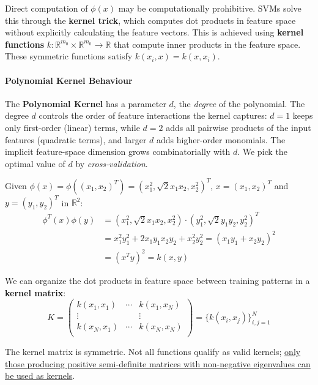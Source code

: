 Direct computation of $\phi(x)$ may be computationally prohibitive. SVMs solve this through the \textbf{kernel trick}, which computes dot products in feature space without explicitly calculating the feature vectors. This is achieved using \textbf{kernel functions} $k: \mathbb{R}^{m_0} \times \mathbb{R}^{m_0} \rightarrow \mathbb{R}$ that compute inner products in the feature space. These symmetric functions satisfy $k(x_i, x) = k(x, x_i)$.

\paragraph{Polynomial Kernel Behaviour}
    The \textbf{Polynomial Kernel} has a parameter $d$, the \textit{degree} of the polynomial. The degree $d$ controls the order of feature interactions the kernel captures: $d=1$ keeps only first-order (linear) terms, while $d=2$ adds all pairwise products of the input features (quadratic terms), and larger $d$ adds higher-order monomials. The implicit feature-space dimension grows combinatorially with $d$. We pick the optimal value of $d$ by \textit{cross-validation}.

\begin{example}
Given $\phi(x) = \phi((x_1, x_2)^T) = (x_1^2, \sqrt{2}x_1x_2, x_2^2)^T$, $x = (x_1, x_2)^T$ and $y = (y_1, y_2)^T$ in $\mathbb{R}^2$:
\begin{align*}
    \phi^T(x)\phi(y) &= (x_1^2, \sqrt{2}x_1x_2, x_2^2) \cdot (y_1^2, \sqrt{2}y_1y_2, y_2^2)^T \\
    &= x_1^2y_1^2 + 2x_1y_1x_2y_2 + x_2^2y_2^2 = (x_1y_1 + x_2y_2)^2 \\
    &= (x^Ty)^2 = k(x, y)
\end{align*}
\end{example}

We can organize the dot products in feature space between training patterns in a \textbf{kernel matrix}:
\begin{equation*}
    K = \begin{pmatrix}
        k(x_1,x_1) & \cdots & k(x_1, x_N) \\
        \vdots & & \vdots \\
        k(x_N,x_1) & \cdots & k(x_N, x_N) \\
        \end{pmatrix} = \{k(x_i, x_j)\}_{i,j=1}^N
\end{equation*}

The kernel matrix is symmetric. Not all functions qualify as valid kernels; \href{https://en.wikipedia.org/wiki/Mercer%27s_theorem}{only those producing positive semi-definite matrices with non-negative eigenvalues can be used as kernels}.

